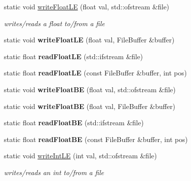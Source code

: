 \begin{DoxyCompactItemize}
static void \hyperlink{classnta_1_1IOManager_aa9855baef3ed91e4e95e3a5e899ba473}{write\+Float\+LE} (float val, std\+::ofstream \&file)
\begin{DoxyCompactList}\small\item\em writes/reads a float to/from a file \end{DoxyCompactList}\item 
\mbox{\label{classnta_1_1IOManager_adc695b9f45e8eed4224ab1889619883c}} 
static void {\bfseries write\+Float\+LE} (float val, File\+Buffer \&buffer)
\item 
\mbox{\label{classnta_1_1IOManager_aeb9265151298c4c9f5868ec7624eee2a}} 
static float {\bfseries read\+Float\+LE} (std\+::ifstream \&file)
\item 
\mbox{\label{classnta_1_1IOManager_ab96b9f46c4a0deeb326d3eea844b1898}} 
static float {\bfseries read\+Float\+LE} (const File\+Buffer \&buffer, int pos)
\item 
\mbox{\label{classnta_1_1IOManager_ae5350032528c4909c5c23bb771f969fd}} 
static void {\bfseries write\+Float\+BE} (float val, std\+::ofstream \&file)
\item 
\mbox{\label{classnta_1_1IOManager_a9dd584ae18cdb0f9a5277e2b5b9a44ff}} 
static void {\bfseries write\+Float\+BE} (float val, File\+Buffer \&buffer)
\item 
\mbox{\label{classnta_1_1IOManager_a4c7e24624617b27fe3292bc93f932f93}} 
static float {\bfseries read\+Float\+BE} (std\+::ifstream \&file)
\item 
\mbox{\label{classnta_1_1IOManager_a9874eea8a64cd1407a5841232cdae3c6}} 
static float {\bfseries read\+Float\+BE} (const File\+Buffer \&buffer, int pos)
\item 
\mbox{\label{classnta_1_1IOManager_ad6ed0ff2efedb9388641d9456fd215b5}} 
static void \hyperlink{classnta_1_1IOManager_ad6ed0ff2efedb9388641d9456fd215b5}{write\+Int\+LE} (int val, std\+::ofstream \&file)
\begin{DoxyCompactList}\small\item\em writes/reads an int to/from a file \end{DoxyCompactList}\item 

\end{DoxyCompactItemize}
